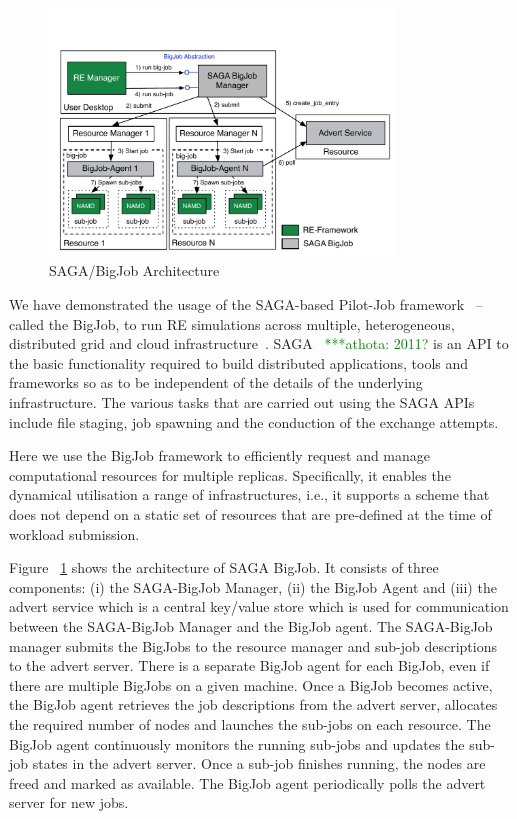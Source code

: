 \documentclass{rspublic}
\newcommand{\athotanote}[1]{ {\textcolor{green} { ***athota: #1 }}}
\newcommand{\athotanote}[1]{}
\begin{document}
\begin{figure}[t]
      \centering
          \includegraphics[width=0.82\textwidth]{../figures/Bigjob_arch.pdf}
          \caption{\footnotesize SAGA/BigJob Architecture
              }
      \label{fig:bigjob}
\end{figure}

We have demonstrated the usage of the SAGA-based Pilot-Job
framework~\citep{saga_bigjob_condor_cloud} -- called the BigJob, to
run RE simulations across multiple, heterogeneous, distributed grid
and cloud infrastructure~\citep{Luckow:2008fp}.  SAGA~\citep{saga-url} \athotanote{2011?}
is an API to the basic functionality required to build distributed
applications, tools and frameworks so as to be independent of the
details of the underlying infrastructure.  The various tasks that are
carried out using the SAGA APIs include file staging, job spawning and
the conduction of the exchange attempts.

Here we use the BigJob framework to efficiently request and manage
computational resources for multiple replicas.  Specifically, it
enables the dynamical utilisation a range of infrastructures, i.e., it
supports a scheme that does not depend on a static set of resources
that are pre-defined at the time of workload submission.

Figure ~\ref{fig:bigjob} shows the architecture of SAGA BigJob.  It
consists of three components: (i) the SAGA-BigJob Manager, (ii) the
BigJob Agent and (iii) the advert service which is a central key/value
store which is used for communication between the SAGA-BigJob Manager
and the BigJob agent.  The SAGA-BigJob manager submits the BigJobs to
the resource manager and sub-job descriptions to the advert server.
There is a separate BigJob agent for each BigJob, even if there are
multiple BigJobs on a given machine.  Once a BigJob becomes active,
the BigJob agent retrieves the job descriptions from the advert
server, allocates the required number of nodes and launches the
sub-jobs on each resource. The BigJob agent continuously monitors the
running sub-jobs and updates the sub-job states in the advert
server. Once a sub-job finishes running, the nodes are freed and
marked as available. The BigJob agent periodically polls the advert
server for new jobs.
\end{document}
